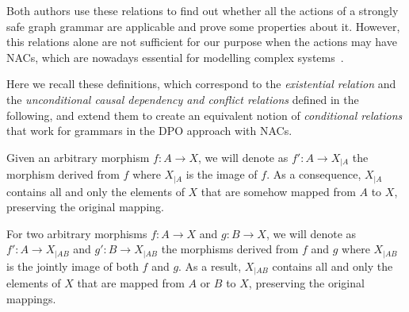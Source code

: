 Both authors use these relations to find out whether all the actions of a strongly safe graph grammar are applicable and prove some properties about it. However, this relations alone are not sufficient for our purpose when the actions may have NACs, which are nowadays essential for modelling complex systems~\cite{Corradini2014}.

Here we recall these definitions, which correspond to the \emph{existential relation} and the \emph{unconditional causal dependency and conflict relations} defined in the following, and extend them to create an equivalent notion of \emph{conditional relations} that work for grammars in the DPO approach with NACs.

\begin{notation} Given an arbitrary morphism $f : A \rightarrow X$, we will denote as $f' : A \rightarrow X_{|A}$ the morphism derived from $f$ where $X_{|A}$ is the image of $f$. As a consequence, $X_{|A}$ contains all and only the elements of $X$ that are somehow mapped from $A$ to $X$, preserving the original mapping.

  For two arbitrary morphisms $f : A \rightarrow X$ and $g : B \rightarrow X$, we will denote as $f' : A \rightarrow X_{|AB}$ and $g' : B \rightarrow X_{|AB}$ the morphisms derived from $f$ and $g$ where $X_{|AB}$ is the jointly image of both $f$ and $g$. As a result, $X_{|AB}$ contains all and only the elements of $X$ that are mapped from $A$ or $B$ to $X$, preserving the original mappings.
\end{notation}

